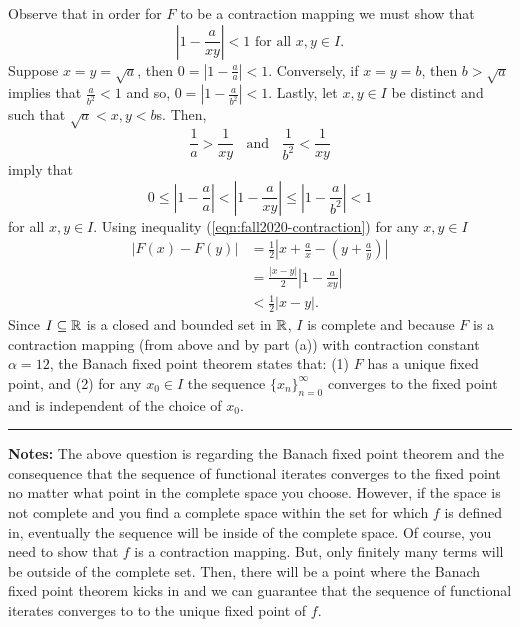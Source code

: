 \documentclass{article}
\begin{document}
Observe that in order for $F$ to be a contraction mapping we must show that 
	\begin{equation}\label{eqn:fall2020-contraction}
		\left|1 - \frac{a}{xy}\right| < 1 \text{ for all } x,y\in I.
	\end{equation}
Suppose $x = y = \sqrt{a}$, then $0 = \left|1 - \frac{a}{a} \right| < 1$. Conversely, if $x = y = b$, then $b > \sqrt{a}$ implies that $\frac{a}{b^2} < 1$ and so, $0 = \left|1 - \frac{a}{b^2} \right| < 1$. Lastly, let $x,y\in I$ be distinct and such that $\sqrt{a} < x,y < b$s. Then, 
	\begin{equation}\label{eqn:fall2020-inequality}
		\frac{1}{a} > \frac{1}{xy} \;\; \text{ and } \;\; \frac{1}{b^2} < \frac{1}{xy}
	\end{equation}
imply that 
\[ 0 \leq \left|1 - \frac{a}{a}\right| < \left|1 - \frac{a}{xy}\right|  \leq \left|1 - \frac{a}{b^2}\right| < 1 \]
for all $x,y\in I$. Using inequality (\ref{eqn:fall2020-contraction}) for any $x,y\in I$
	\begin{align}
		|F(x) - F(y)| & =\frac{1}{2} \left|x +\frac{a}{x} - \left(y +\frac{a}{y}\right)\right|\\
				  & = \frac{|x-y|}{2}\left|1 - \frac{a}{xy}\right|\\
				  & < \frac{1}{2}|x-y|.
	\end{align}
Since $I\subseteq\mathbb R$ is a closed and bounded set in $\mathbb R$, $I$ is complete and because $F$ is a contraction mapping (from above and by part (a)) with contraction constant $\alpha = {1}{2}$, the Banach fixed point theorem states that: (1) $F$ has a unique fixed point, and (2) for any $x_0\in I$ the sequence $\{x_n\}_{n = 0}^\infty$ converges to the fixed point and is independent of the choice of $x_0$.\\ 

\hrule 

\textbf{Notes:} The above question is regarding the Banach fixed point theorem and the consequence that the sequence of functional iterates converges to the fixed point no matter what point in the complete space you choose. However, if the space is not complete and you find a complete space within the set for which $f$ is defined in, eventually the sequence will be inside of the complete space. Of course, you need to show that $f$ is a contraction mapping. But, only finitely many terms will be outside of the complete set. Then, there will be a point where the Banach fixed point theorem kicks in and we can guarantee that the sequence of functional iterates converges to to the unique fixed point of $f$. 
\end{document}
